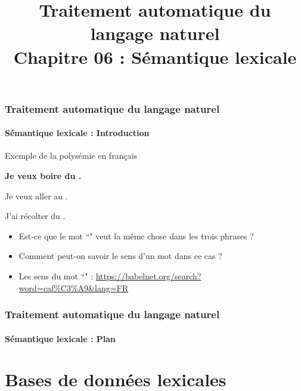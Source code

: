 \documentclass[xcolor=table]{beamer}
\title[TALN : 06- Sémantique lexicale]%
{Traitement automatique du langage naturel\\Chapitre 06 : Sémantique lexicale}
\begin{document}
	
\begin{frame}
\frametitle{Traitement automatique du langage naturel}
\framesubtitle{Sémantique lexicale : Introduction}

\begin{exampleblock}{Exemple de la polysémie en français}
	\begin{center}
		\Large\bfseries
			Je veux boire du .
			
			Je veux aller au .
			
			J'ai récolter du .
	\end{center}
\end{exampleblock}

\begin{itemize}
	\item Est-ce que le mot ``" veut la même chose dans les trois phrases ?
	\item Comment peut-on savoir le sens d'un mot dans ce cas ?
	\item Les sens du mot ``" : \url{https://babelnet.org/search?word=caf\%C3\%A9&lang=FR}
\end{itemize}

\end{frame}

%
%

\begin{frame}
\frametitle{Traitement automatique du langage naturel}
\framesubtitle{Sémantique lexicale : Plan}

\begin{multicols}{2}
\tableofcontents
\end{multicols}
\end{frame}

\section{Bases de données lexicales}
\end{document}

